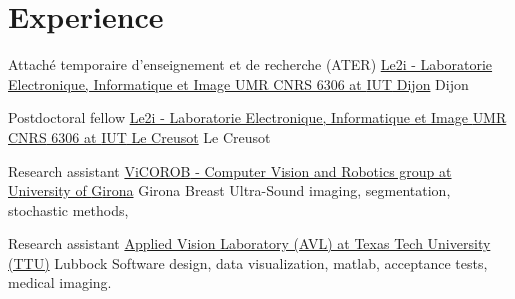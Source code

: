 
\section{Experience}



{Attach\'{e} temporaire d'enseignement et de recherche (ATER)}
{\href{http://le2i.cnrs.fr/?lang=en}{Le2i - Laboratorie Electronique, Informatique et Image {UMR CNRS} 6306 at {IUT} Dijon}}
{}
{Dijon}
{}

{Postdoctoral fellow}
{\href{http://le2i.cnrs.fr/?lang=en}{Le2i - Laboratorie Electronique, Informatique et Image {UMR CNRS} 6306 at {IUT} Le Creusot}}
{}
{Le Creusot}
{}

{Research assistant}
{\href{http://vicorob.udg.edu}{{ViCOROB} - Computer Vision and Robotics group at {U}niversity of {G}irona}}
{}
{Girona}
{
  Breast Ultra-Sound imaging, segmentation, stochastic methods,  
}

{Research assistant}
{\href{http://www.depts.ttu.edu/ece/groups/appliedvision/}{Applied Vision Laboratory (AVL) at Texas Tech University (TTU)}}
{}
{Lubbock}
{
Software design, data visualization, matlab, acceptance tests, medical imaging.
}



